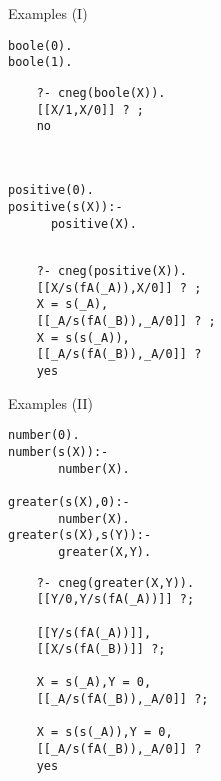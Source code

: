 \documentclass[pdf,slideColor,contemporain]{prosper}
\begin{document}
\begin{slide}{Examples (I)}
\begin{small}

 \begin{minipage}{1.6in}
\begin{verbatim}
boole(0).
boole(1).
\end{verbatim}
\end{minipage}
\begin{minipage}{2in}
{\blue
\begin{verbatim} 
    ?- cneg(boole(X)).
    [[X/1,X/0]] ? ;
    no
\end{verbatim} 
}%
\end{minipage}\\
\vspace{0.5cm}
\begin{minipage}{1.6in}
\begin{verbatim}
positive(0). 
positive(s(X)):-
      positive(X).  
\end{verbatim}
\end{minipage}
\begin{minipage}{2in}
{\blue
\begin{verbatim} 

    ?- cneg(positive(X)).
    [[X/s(fA(_A)),X/0]] ? ;
    X = s(_A),
    [[_A/s(fA(_B)),_A/0]] ? ;
    X = s(s(_A)),
    [[_A/s(fA(_B)),_A/0]] ? 
    yes
\end{verbatim} 
}%
\end{minipage}

\end{small}

\end{slide}


\begin{slide}{Examples (II)}
\vspace{-0.2cm}
\begin{small}
\begin{minipage}{1.7in}
\begin{verbatim}
number(0).
number(s(X)):-
       number(X).

greater(s(X),0):-
       number(X).
greater(s(X),s(Y)):-
       greater(X,Y).
\end{verbatim}
\end{minipage}
\begin{minipage}{2in}
{\blue
\begin{verbatim} 
    ?- cneg(greater(X,Y)).
    [[Y/0,Y/s(fA(_A))]] ?;

    [[Y/s(fA(_A))]],
    [[X/s(fA(_B))]] ?;

    X = s(_A),Y = 0,
    [[_A/s(fA(_B)),_A/0]] ?;

    X = s(s(_A)),Y = 0,
    [[_A/s(fA(_B)),_A/0]] ? 
    yes
\end{verbatim} 
}%
\end{minipage}

\end{small}

\end{slide}
\end{document}

